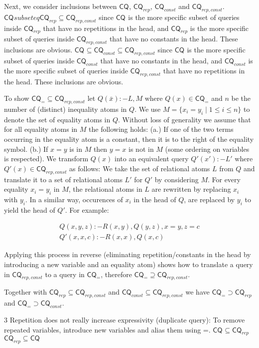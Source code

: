 \documentclass[a4paper,12pt]{article}
\newcommand{\cq}[1]{\ensuremath{\mathsf{CQ}_{#1}}}
\begin{document}
Next, we consider inclusions between \cq{}, \cq{rep}, \cq{const} and \cq{rep,const}.
$\cq{} subseteq \cq{rep} \subseteq \cq{rep,const}$ since \cq{} is the more specific subset of queries inside \cq{rep} that have no repetitions in the head, and \cq{rep} is the more specific subset of queries inside \cq{rep,const} that have no constants in the head. These inclusions are obvious.
$\cq{} \subseteq \cq{const} \subseteq \cq{rep,const}$ since \cq{} is the more specific subset of queries inside \cq{const} that have no constants in the head, and \cq{const} is the more specific subset of queries inside \cq{rep,const} that have no repetitions in the head. These inclusions are obvious.

To show $\cq{=} \subseteq \cq{rep,const}$ let $Q(\bar{x}) :- L, M$ where $Q(x) \in \cq{=}$ and $n$ be the number of (distinct) inequality atoms in $Q$. We use $M = \{ x_i = y_i \mid 1 \leq i \leq n\}$ to denote the set of equality atoms in $Q$. Without loss of generality we assume that for all equality atoms in $M$ the following holds: (a.) If one of the two terms occurring in the equality atom is a constant, then it is to the right of the equality symbol. (b.) If $x = y$ is in $M$ then $y = x$ is not in $M$ (some ordering on variables is respected). We transform $Q(x)$ into an equivalent query $Q'(x') :- L'$ where $Q'(x) \in \cq{rep,const}$ as follows: We take the set of relational atoms $L$ from $Q$ and translate it to a set of relational atoms $L'$ for $Q'$ by considering $M$. For every equality $x_i = y_i$ in $M$, the relational atoms in $L$ are rewritten by replacing $x_i$ with $y_i$. In a similar way, occurences of $x_i$ in the head of $Q$, are replaced by $y_i$ to yield the head of $Q'$. For example:

\begin{align}
Q(x,y,z) :- R(x,y), Q(y,z), x = y, z = c \\
Q'(x,x,c) :- R(x,x), Q(x,c)
\end{align}

Applying this process in reverse (eliminating repetition/constants in the head by introducing a new variable and an equality atom) shows how to translate a query in \cq{rep,const} to a query in \cq{=}, therefore $\cq{=} \supseteq \cq{rep,const}$.

Together with $\cq{rep} \subseteq \cq{rep,const}$ and $\cq{const} \subseteq \cq{rep,const}$ we have $\cq{=} \supset \cq{rep}$ and $\cq{=} \supset \cq{const}$.

3 Repetition does not really increase expressivity (duplicate query):
To remove repeated variables, introduce new variables and alias them using =.
$\cq{}    \subseteq \cq{rep}$
$\cq{rep} \subseteq \cq{}$
\end{document}
